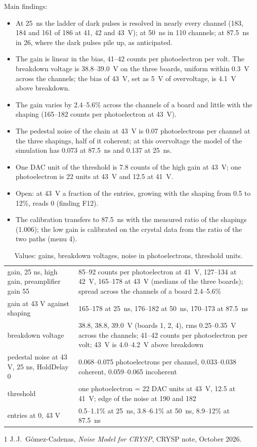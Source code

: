 \documentclass[11pt,a4paper]{article}
\begin{document}
Main findings:
\begin{itemize}
\item At 25~ns the ladder of dark pulses is resolved in nearly every channel (183, 184 and
  161 of 186 at 41, 42 and 43~V); at 50~ns in 110 channels; at 87.5~ns in 26, where the dark
  pulses pile up, as anticipated.
\item The gain is linear in the bias, 41--42 counts per photoelectron per volt. The
  breakdown voltage is 38.8--39.0~V on the three boards, uniform within 0.3~V across the
  channels; the bias of 43~V, set as 5~V of overvoltage, is 4.1~V above breakdown.
\item The gain varies by 2.4--5.6\% across the channels of a board and little with the
  shaping (165--182 counts per photoelectron at 43~V).
\item The pedestal noise of the chain at 43~V is 0.07 photoelectrons per channel at the three
  shapings, half of it coherent; at this overvoltage the model of the simulation has 0.073 at
  87.5~ns and 0.137 at 25~ns.
\item One DAC unit of the threshold is 7.8 counts of the high gain at 43~V; one photoelectron
  is 22 units at 43~V and 12.5 at 41~V.
\item Open: at 43~V a fraction of the entries, growing with the shaping from 0.5 to 12\%,
  reads 0 (finding F12).
\item The calibration transfers to 87.5~ns with the measured ratio of the shapings (1.006);
  the low gain is calibrated on the crystal data from the ratio of the two paths (menu 4).
\end{itemize}

\begin{table}[H]
\centering
\small
\begin{tabular}{p{}p{}}
\toprule
gain, 25 ns, high gain, preamplifier gain 55 & 85--92 counts per photoelectron at 41~V,
  127--134 at 42~V, 165--178 at 43~V (medians of the three boards); spread across the channels
  of a board 2.4--5.6\% \\
gain at 43 V against shaping & 165--178 at 25~ns, 176--182 at 50~ns, 170--173 at 87.5~ns \\
breakdown voltage & 38.8, 38.8, 39.0~V (boards 1, 2, 4), rms 0.25--0.35~V across the
  channels; 41--42 counts per photoelectron per volt; 43~V is 4.0--4.2~V above breakdown \\
pedestal noise at 43 V, 25 ns, HoldDelay 0 & 0.068--0.075 photoelectrons per channel,
  0.033--0.038 coherent, 0.059--0.065 incoherent \\
threshold & one photoelectron = 22 DAC units at 43~V, 12.5 at 41~V; edge of the noise at
  190 and 182 \\
entries at 0, 43 V & 0.5--1.1\% at 25~ns, 3.8--6.1\% at 50~ns, 8.9--12\% at 87.5~ns \\
\bottomrule
\end{tabular}
\caption{Values: gains, breakdown voltages, noise in photoelectrons, threshold units.}
\label{tab:values}
\end{table}

\begin{thebibliography}{1}
 J.\,J.~Gómez-Cadenas, \emph{Noise Model for CRYSP}, CRYSP note,
  October 2026.
\end{thebibliography}
\end{document}
